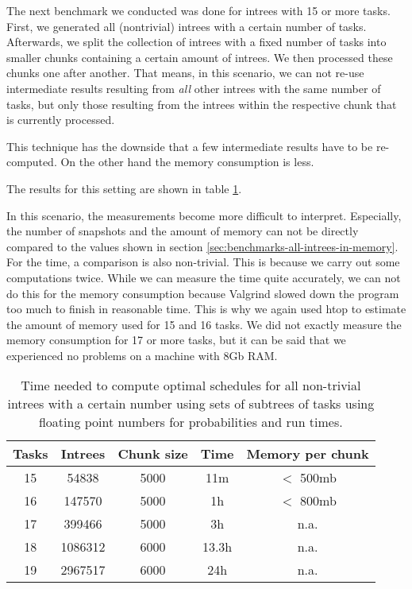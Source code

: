 The next benchmark we conducted was done for intrees with 15 or more tasks. First, we generated all (nontrivial) intrees with a certain number of tasks. Afterwards, we split the collection of intrees with a fixed number of tasks into smaller chunks containing a certain amount of intrees. We then processed these chunks one after another. That means, in this scenario, we can not re-use intermediate results resulting from \emph{all} other intrees with the same number of tasks, but only those resulting from the intrees within the respective chunk that is currently  processed.

This technique has the downside that a few intermediate results have to be re-computed. On the other hand the memory consumption is less.

The results for this setting are shown in table \ref{tab:benchmark-clustered-run-time}.

In this scenario, the measurements become more difficult to interpret. Especially, the number of snapshots and the amount of memory can not be directly compared to the values shown in section \ref{sec:benchmarks-all-intrees-in-memory}. For the time, a comparison is also non-trivial. This is because we carry out some computations twice. While we can measure the time quite accurately, we can not do this for the memory consumption because Valgrind slowed down the program too much to finish in reasonable time. This is why we again used htop to estimate the amount of memory used for 15 and 16 tasks. We did not exactly measure the memory consumption for 17 or more tasks, but it can be said that we experienced no problems on a machine with 8Gb RAM.

\begin{table}[ht]
  \centering
  \begin{tabular}[ht]{ccccc}
    Tasks & Intrees & Chunk size & Time & Memory per chunk \\
    \hline
    15 & 54838 & 5000 & 11m & $<$ 500mb \\
    16 & 147570 & 5000 & 1h & $<$ 800mb \\
    17 & 399466 & 5000 & 3h & n.a. \\
    18 & 1086312 & 6000 & 13.3h & n.a. \\
    19 & 2967517 & 6000 & 24h & n.a.
  \end{tabular}
  \caption{Time needed to compute optimal schedules for all non-trivial intrees  with a certain number using sets of subtrees of tasks using floating point numbers for probabilities and run times.}
  \label{tab:benchmark-clustered-run-time}
\end{table}

